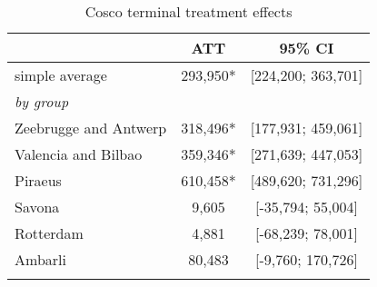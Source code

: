 \begin{table}[ht]
\centering
\caption{Cosco terminal treatment effects} 
\begingroup\begin{adjustbox}{max width=\textwidth}
\begin{tabular}{lcc}
  \hline
\hline
 & ATT & 95\% CI  \\ 
  \hline
simple average & 293,950* & [224,200; 363,701] \\ 
   [1ex]\emph{by group} &  &  \\ 
   \hline
Zeebrugge and Antwerp & 318,496* & [177,931; 459,061] \\ 
  Valencia and Bilbao & 359,346* & [271,639; 447,053] \\ 
  Piraeus & 610,458* & [489,620; 731,296] \\ 
  Savona &   9,605 & [-35,794; 55,004] \\ 
  Rotterdam &   4,881 & [-68,239; 78,001] \\ 
  Ambarli &  80,483 & [-9,760; 170,726] \\ 
   [2ex] \hline \hline {}\end{tabular} 
 \end{adjustbox} \label{tab:cosco_results}
\endgroup
\end{table}
